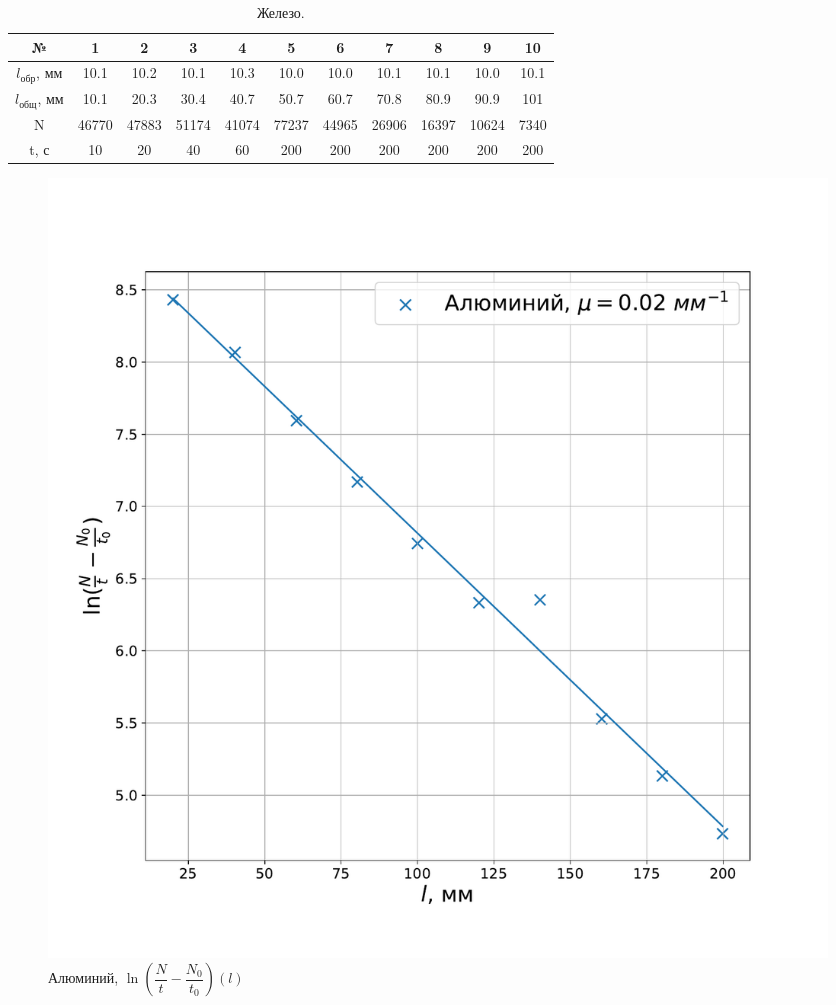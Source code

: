 \documentclass[a4paper, 12pt]{article}
\begin{document}
\begin{table}[!h]
    \centering
    \begin{tabular}{|c|c|c|c|c|c|c|c|c|c|c|}
        \hline
        № & 1 & 2 & 3 & 4 & 5 & 6 & 7 & 8 & 9 & 10\\ \hline
        $l_{обр}$, мм & 10.1 & 10.2 & 10.1 & 10.3 & 10.0 & 10.0 & 10.1 & 10.1 & 10.0 & 10.1\\ \hline
        $l_{общ}$, мм & 10.1 & 20.3 & 30.4 & 40.7 & 50.7 & 60.7 & 70.8 & 80.9 & 90.9 & 101\\ \hline
        N & 46770 & 47883 & 51174 & 41074 & 77237 & 44965 & 26906 & 16397 & 10624 & 7340\\ \hline
        t, с & 10 & 20 & 40 & 60 & 200 & 200 & 200 & 200 & 200 & 200
        \\ \hline
    \end{tabular}
    \caption {Железо.}
    \label{tab:3}
\end{table}

\begin{figure}[!h]
    \includegraphics[scale = 0.35]{graph0}
    \centering
    \caption{Алюминий, $\ln (\dfrac{N}{t} - \dfrac{N_0}{t_0}) (l)$}
\end{figure}
\end{document}
